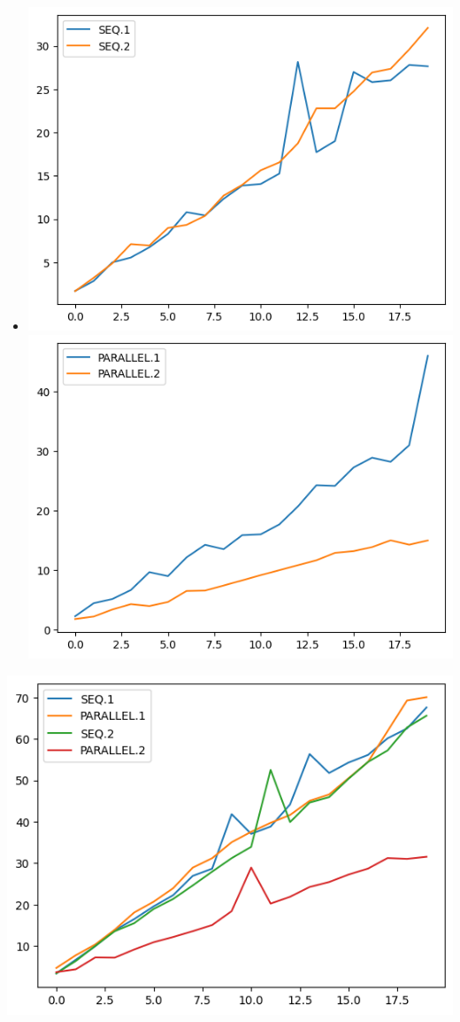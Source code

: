 \documentclass[10pt, a4paper]{article}
\begin{document}
\begin{itemize}
    \item \includegraphics[scale=0.6]{graphs/7.png}
    \includegraphics[scale=0.6]{graphs/8.png}
\end{itemize}

\includegraphics{graphs/9.png}
\end{document}
